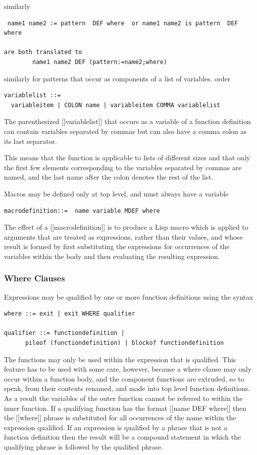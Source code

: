 \documentclass{article}
\begin{document}
similarly
\begin{verbatim}
 name1 name2 := pattern  DEF where  or name1 name2 is pattern  DEF where

are both translated to
        name1 name2 DEF (pattern:=name2;where)
\end{verbatim}

similarly for patterns that occur as components of a list of
variables. order
\begin{verbatim}
variablelist ::=
  variableitem | COLON name | variableitem COMMA variablelist
\end{verbatim}

The parenthesized [[variablelist]] that occurs as a variable of a function
definition can contain variables separated by commas but can also
have a comma colon as its last separator.

This means that the function is applicable to lists of different
sizes and that only the first few elements corresponding to the
variables separated by commas are named, and
the last name after the colon denotes the rest of the list.

Macros may be defined only at top level, and must always have a variable
\begin{verbatim}
macrodefinition::=  name variable MDEF where
\end{verbatim}

The effect of a [[macrodefinition]] is to produce a Lisp macro
which is applied to arguments that are treated as expressions, rather
than their values, and whose result is formed by first substituting
the expressions for occurrences of the variables within the body
and then evaluating the resulting expression.

\subsubsection{Where Clauses}
\label{sec:boot:where-clause}

Expressions may be qualified by one or more function definitions
using the syntax
\begin{verbatim}
where ::= exit | exit WHERE qualifier

qualifier ::= functiondefinition |
      pileof (functiondefinition) | blockof functiondefinition
\end{verbatim}

The functions may only be used within the expression that is qualified.
This feature has to be used with some care, however, because
a where clause may only occur within a function body, and
the component functions are extruded, so to speak, from their contexts
renamed, and made into top level function definitions.
As a result the variables of the outer function cannot be referred to
within the inner function.
If a qualifying function has the format [[name DEF where]] then
the [[where]] phrase is substituted for all occurrences of the name
within the expression qualified.
If an expression is qualified by a phrase that is not a
function definition then the result will be a compound statement
in which the qualifying phrase is followed by the qualified phrase.
\end{document}

